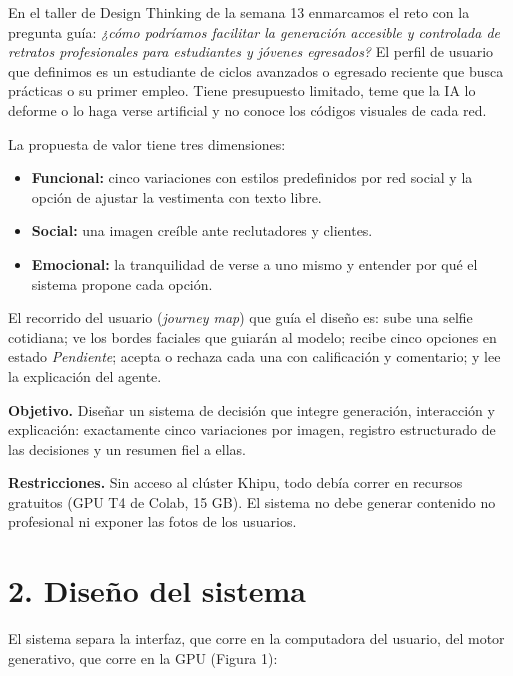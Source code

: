 \documentclass[conference]{IEEEtran}
\begin{document}
En el taller de Design Thinking de la semana 13 enmarcamos el reto con la pregunta guía: \emph{¿cómo podríamos facilitar la generación accesible y controlada de retratos profesionales para estudiantes y jóvenes egresados?} El perfil de usuario que definimos es un estudiante de ciclos avanzados o egresado reciente que busca prácticas o su primer empleo. Tiene presupuesto limitado, teme que la IA lo deforme o lo haga verse artificial y no conoce los códigos visuales de cada red.

La propuesta de valor tiene tres dimensiones:

\begin{itemize}
\item \textbf{Funcional:} cinco variaciones con estilos predefinidos por red social y la opción de ajustar la vestimenta con texto libre.
\item \textbf{Social:} una imagen creíble ante reclutadores y clientes.
\item \textbf{Emocional:} la tranquilidad de verse a uno mismo y entender por qué el sistema propone cada opción.
\end{itemize}

El recorrido del usuario (\emph{journey map}) que guía el diseño es: sube una selfie cotidiana; ve los bordes faciales que guiarán al modelo; recibe cinco opciones en estado \emph{Pendiente}; acepta o rechaza cada una con calificación y comentario; y lee la explicación del agente.

\textbf{Objetivo.} Diseñar un sistema de decisión que integre generación, interacción y explicación: exactamente cinco variaciones por imagen, registro estructurado de las decisiones y un resumen fiel a ellas.

\textbf{Restricciones.} Sin acceso al clúster Khipu, todo debía correr en recursos gratuitos (GPU T4 de Colab, 15 GB). El sistema no debe generar contenido no profesional ni exponer las fotos de los usuarios.

\section*{2. Diseño del sistema}





El sistema separa la interfaz, que corre en la computadora del usuario, del motor generativo, que corre en la GPU (Figura 1):
\end{document}
